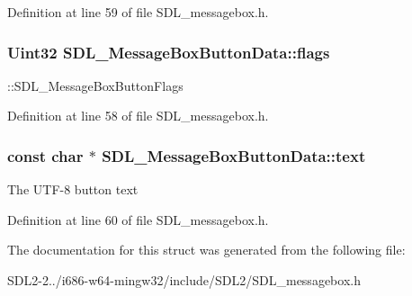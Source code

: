 Definition at line 59 of file S\+D\+L\+\_\+messagebox.\+h.

\hypertarget{structSDL__MessageBoxButtonData_a426c8b5da0e718242c7840706d95de0b}{
\subsubsection[{flags}]{\setlength{\rightskip}{0pt plus 5cm}Uint32 S\+D\+L\+\_\+\+Message\+Box\+Button\+Data\+::flags}}\label{structSDL__MessageBoxButtonData_a426c8b5da0e718242c7840706d95de0b}
\+::\+S\+D\+L\+\_\+\+Message\+Box\+Button\+Flags 

Definition at line 58 of file S\+D\+L\+\_\+messagebox.\+h.

\hypertarget{structSDL__MessageBoxButtonData_a68776c143a233a93092f7707c843c438}{
\subsubsection[{text}]{\setlength{\rightskip}{0pt plus 5cm}const char $\ast$ S\+D\+L\+\_\+\+Message\+Box\+Button\+Data\+::text}}\label{structSDL__MessageBoxButtonData_a68776c143a233a93092f7707c843c438}
The U\+T\+F-\/8 button text 

Definition at line 60 of file S\+D\+L\+\_\+messagebox.\+h.



The documentation for this struct was generated from the following file\+:\begin{DoxyCompactItemize}
\item 
S\+D\+L2-\/2../i686-\/w64-\/mingw32/include/\+S\+D\+L2/S\+D\+L\+\_\+messagebox.\+h\end{DoxyCompactItemize}

